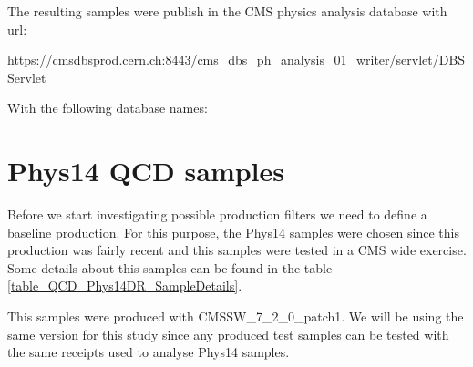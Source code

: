 \documentclass[a4paper]{article}
\begin{document}
The resulting samples were publish in the CMS physics analysis database with url:

\begin{center}
https://cmsdbsprod.cern.ch:8443/cms\_dbs\_ph\_analysis\_01\_writer/servlet/DBSServlet
\end{center}

With the following database names:
 
\begin{table}
\centering
 

\caption{TODO}
\label{table_RunI_QCDFiltered_SampleNames}
\end{table}



\section{Phys14 QCD samples}

Before we start investigating possible production filters we need to define a baseline production. For this purpose, the Phys14 samples were chosen since this production was fairly recent and this samples were tested in a CMS wide exercise. Some details about this samples can be found in the table \ref{table_QCD_Phys14DR_SampleDetails}.



This samples were produced with CMSSW\_7\_2\_0\_patch1. We will be using the same version for this study since any produced test samples can be tested with the same receipts used to analyse Phys14 samples.
\end{document}
